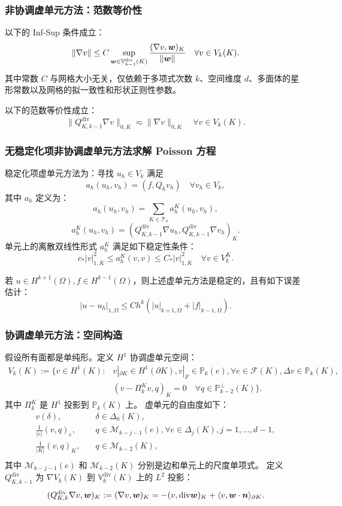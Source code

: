 \documentclass[notheorems,serif]{beamer}
\begin{document}
\begin{frame}
    \frametitle{非协调虚单元方法：范数等价性}
    \begin{lemma}
        以下的 Inf-Sup 条件成立：
        $$
        \|\nabla v\| \leq C \sup_{\boldsymbol{w} \in
        \mathbb{V}^{\mathrm{div}}_{k-1}(K)}\frac{(\nabla v,
        \boldsymbol{w})_K}{\|\boldsymbol{w}\|} \quad \forall v \in V_k(K).
        $$
        其中常数 $C$ 与网格大小无关，仅依赖于多项式次数 $k$、空间维度 $d$、多面体的星形常数以及网格的拟一致性和形状正则性参数。
        
        以下的范数等价性成立：
        $$
        \|Q_{K, k-1}^{\mathrm{div}}\nabla v\|_{0, K} \eqsim \|\nabla v\|_{0, K} 
        \quad \forall v \in V_k(K).
        $$
    \end{lemma}
\end{frame}

\begin{frame}
\frametitle{无稳定化项非协调虚单元方法求解 Poisson 方程}
\small{
稳定化项虚单元方法为：寻找 $u_h \in V_k$ 满足
$$
a_h(u_h, v_h) = (f, Q_h v_h) \quad \forall v_h \in V_k,
$$
其中 $a_h$ 定义为：
$$
a_h(u_h, v_h) = \sum_{K \in \mathcal{T}_h} a_h^K(u_h, v_h),
$$
$$
a_h^K(u_h, v_h) = (Q_{K, k-1}^{\mathrm{div}}\nabla u_h, Q_{K,
k-1}^{\mathrm{div}}\nabla v_h)_K.
$$
单元上的离散双线性形式 $a_h^K$ 满足如下稳定性条件：
$$
c_* |v|_{1, K}^2 \leq a_h^K(v, v) \leq C_* |v|_{1, K}^2 \quad \forall v \in
V_k^K.
$$
\begin{theorem}
若 $u \in H^{k+1}(\Omega), f \in H^{k-1}(\Omega)$，则上述虚单元方法是稳定的，且有如下误差估计：
$$
|u - u_h|_{1, \Omega} \leq C h^{k}
(|u|_{k+1, \Omega} + |f|_{k-1, \Omega}).
$$
\end{theorem}
}
\end{frame}

\begin{frame}
\frametitle{协调虚单元方法：空间构造}
假设所有面都是单纯形。定义 $H^1$ 协调虚单元空间：
$$
\begin{aligned}
    V_k(K) := \{v \in H^1(K): & v|_{\partial K} \in H^1(\partial K), v|_F \in 
        \mathbb{P}_k(e), \forall e \in \mathcal{F}(K),
    \Delta v \in \mathbb{P}_{k}(K),\\
    & (v-\Pi_k^K v, q)_K = 0 \quad \forall q \in
    \mathbb{P}_{k-2}^{\perp}(K)\}.
\end{aligned}
$$
其中 $\Pi_k^K$ 是 $H^1$ 投影到 $\mathbb{P}_k(K)$ 上。
虚单元的自由度如下：
$$
\begin{aligned} 
    v(\delta), & \quad \delta \in \Delta_0(K), \\
    \frac{1}{|e|}(v, q)_{e}, & \quad q \in \mathcal{M}_{k-j-1}(e), \forall e \in
    \Delta_j(K), j = 1, \dots, d-1,\\
    \frac{1}{|K|}(v, q)_{K}, & \quad q\in \mathcal{M}_{k-2}(K), \\
\end{aligned}
$$
其中 $\mathcal{M}_{k-j-1}(e)$ 和 $\mathcal{M}_{k-2}(K)$ 分别是边和单元上的尺度单项式。
定义 $Q_{K, k-1}^{\mathrm{div}}$ 为 $\nabla V_k(K)$ 到
$\mathbb{V}^{\mathrm{div}}_{k}(K)$ 上的 $L^2$ 投影：
$$
(Q_{K, k}^{\mathrm{div}}\nabla v, \boldsymbol{w})_K := (\nabla v,
\boldsymbol{w})_K = -(v, \mathrm{div} \boldsymbol{w})_K + \langle v, \boldsymbol{w} 
\cdot \boldsymbol{n}\rangle_{\partial K}.
$$
\end{frame}
\end{document}
